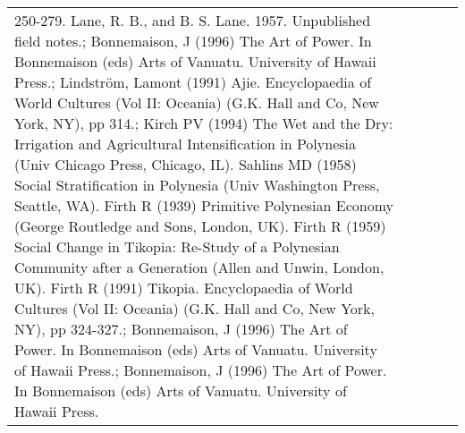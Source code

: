 \begin{longtable}{p{5cm}p{2cm}p{2cm}p{2cm}p{2cm}}
250-279. Lane, R. B., and B. S. Lane. 1957. Unpublished field notes.; Bonnemaison, J (1996) The Art of Power. In Bonnemaison (eds) Arts of Vanuatu. University of Hawaii Press.; Lindström, Lamont (1991) Ajie. Encyclopaedia of World Cultures (Vol II: Oceania) (G.K. Hall and Co, New York, NY), pp 314.; Kirch PV (1994) The Wet and the Dry: Irrigation and Agricultural Intensification in Polynesia (Univ Chicago Press, Chicago, IL). Sahlins MD (1958) Social Stratification in Polynesia (Univ Washington Press, Seattle, WA). Firth R (1939) Primitive Polynesian Economy (George Routledge and Sons, London, UK). Firth R (1959) Social Change in Tikopia: Re-Study of a Polynesian Community after a Generation (Allen and Unwin, London, UK). Firth R (1991) Tikopia. Encyclopaedia of World Cultures (Vol II: Oceania) (G.K. Hall and Co, New York, NY), pp 324-327.; Bonnemaison, J (1996) The Art of Power. In Bonnemaison (eds) Arts of Vanuatu. University of Hawaii Press.; Bonnemaison, J (1996) The Art of Power. In Bonnemaison (eds) Arts of Vanuatu. University of Hawaii Press. \\ 

\end{longtable}
